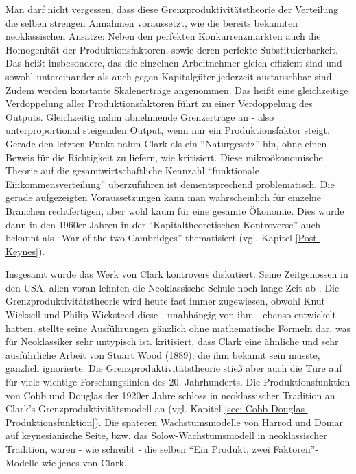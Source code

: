 Man darf nicht vergessen, dass diese Grenzproduktivitätstheorie der Verteilung die selben strengen Annahmen voraussetzt, wie die bereits bekannten neoklassischen Ansätze: Neben den perfekten Konkurrenzmärkten auch die Homogenität der Produktionsfaktoren, sowie deren perfekte Substituierbarkeit. Das heißt insbesondere, das die einzelnen Arbeitnehmer gleich effizient sind und sowohl untereinander als auch gegen Kapitalgüter jederzeit austauschbar sind. Zudem werden konstante Skalenerträge angenommen. Das heißt eine gleichzeitige Verdoppelung aller Produktionsfaktoren führt zu einer Verdoppelung des Outputs. Gleichzeitig nahm \textcite{Clark1899} abnehmende Grenzerträge an - also unterproportional steigenden Output, wenn nur ein Produktionsfaktor steigt. Gerade den letzten Punkt nahm Clark als ein "`Naturgesetz"' hin, ohne einen Beweis für die Richtigkeit zu liefern, wie \textcite[S. 32]{Tobin1985} kritisiert. Diese mikroökonomische Theorie auf die gesamtwirtschaftliche Kennzahl "`funktionale Einkommensverteilung"' überzuführen ist dementsprechend problematisch. Die gerade aufgezeigten Voraussetzungen kann man wahrscheinlich für einzelne Branchen rechtfertigen, aber wohl kaum für eine gesamte Ökonomie. Dies wurde dann in den 1960er Jahren in der "`Kapitaltheoretischen Kontroverse"' auch bekannt als "`War of the two Cambridges"' thematisiert (vgl. Kapitel \ref{Post-Keynes}).

Insgesamt wurde das Werk von Clark kontrovers diskutiert. Seine Zeitgenossen in den USA, allen voran \textcite{Veblen1909} lehnten die Neoklassische Schule noch lange Zeit ab \parencite[S. 97]{Persky2000}. Die Grenzproduktivitätstheorie wird heute fast immer \textcite{Clark1899} zugewiesen, obwohl Knut Wicksell und Philip Wicksteed diese - unabhängig von ihm - ebenso entwickelt hatten. \textcite{Clark1891, Clark1899} stellte seine Ausführungen gänzlich ohne mathematische Formeln dar, was für Neoklassiker sehr untypisch ist. \textcite{Tobin1985} kritisiert, dass Clark eine ähnliche und sehr ausführliche Arbeit von Stuart Wood (1889), die ihm bekannt sein musste, gänzlich ignorierte. Die Grenzproduktivitätstheorie stieß aber auch die Türe auf für viele wichtige Forschungslinien des 20. Jahrhunderts. Die Produktionsfunktion von Cobb und Douglas der 1920er Jahre schloss in neoklassischer Tradition an Clark's Grenzproduktivitätsmodell an (vgl. Kapitel \ref{sec: Cobb-Douglas-Produktionsfunktion}). Die späteren  Wachstumsmodelle von Harrod und Domar auf keynesianische Seite, bzw. das Solow-Wachstumsmodell in neoklassischer Tradition, waren - wie \textcite{Tobin1985} schreibt - die selben "`Ein Produkt, zwei Faktoren"'-Modelle wie jenes von Clark.


